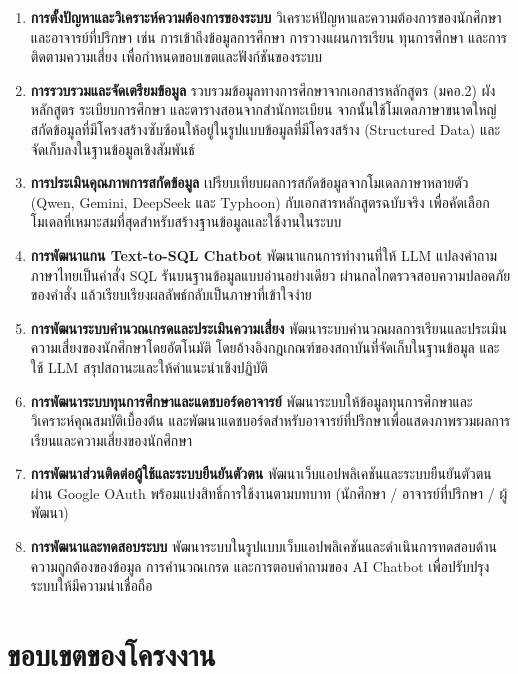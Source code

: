 \begin{enumerate}
    \item \textbf{การตั้งปัญหาและวิเคราะห์ความต้องการของระบบ} วิเคราะห์ปัญหาและความต้องการของนักศึกษาและอาจารย์ที่ปรึกษา เช่น การเข้าถึงข้อมูลการศึกษา การวางแผนการเรียน ทุนการศึกษา และการติดตามความเสี่ยง เพื่อกำหนดขอบเขตและฟังก์ชันของระบบ
    \item \textbf{การรวบรวมและจัดเตรียมข้อมูล} รวบรวมข้อมูลทางการศึกษาจากเอกสารหลักสูตร (มคอ.2) ผังหลักสูตร ระเบียบการศึกษา และตารางสอนจากสำนักทะเบียน จากนั้นใช้โมเดลภาษาขนาดใหญ่สกัดข้อมูลที่มีโครงสร้างซับซ้อนให้อยู่ในรูปแบบข้อมูลที่มีโครงสร้าง (Structured Data) และจัดเก็บลงในฐานข้อมูลเชิงสัมพันธ์
    \item \textbf{การประเมินคุณภาพการสกัดข้อมูล} เปรียบเทียบผลการสกัดข้อมูลจากโมเดลภาษาหลายตัว (Qwen, Gemini, DeepSeek และ Typhoon) กับเอกสารหลักสูตรฉบับจริง เพื่อคัดเลือกโมเดลที่เหมาะสมที่สุดสำหรับสร้างฐานข้อมูลและใช้งานในระบบ
    \item \textbf{การพัฒนาแกน Text-to-SQL Chatbot} พัฒนาแกนการทำงานที่ให้ LLM แปลงคำถามภาษาไทยเป็นคำสั่ง SQL รันบนฐานข้อมูลแบบอ่านอย่างเดียว ผ่านกลไกตรวจสอบความปลอดภัยของคำสั่ง แล้วเรียบเรียงผลลัพธ์กลับเป็นภาษาที่เข้าใจง่าย
    \item \textbf{การพัฒนาระบบคำนวณเกรดและประเมินความเสี่ยง} พัฒนาระบบคำนวณผลการเรียนและประเมินความเสี่ยงของนักศึกษาโดยอัตโนมัติ โดยอ้างอิงกฎเกณฑ์ของสถาบันที่จัดเก็บในฐานข้อมูล และใช้ LLM สรุปสถานะและให้คำแนะนำเชิงปฏิบัติ
    \item \textbf{การพัฒนาระบบทุนการศึกษาและแดชบอร์ดอาจารย์} พัฒนาระบบให้ข้อมูลทุนการศึกษาและวิเคราะห์คุณสมบัติเบื้องต้น และพัฒนาแดชบอร์ดสำหรับอาจารย์ที่ปรึกษาเพื่อแสดงภาพรวมผลการเรียนและความเสี่ยงของนักศึกษา
    \item \textbf{การพัฒนาส่วนติดต่อผู้ใช้และระบบยืนยันตัวตน} พัฒนาเว็บแอปพลิเคชันและระบบยืนยันตัวตนผ่าน Google OAuth พร้อมแบ่งสิทธิ์การใช้งานตามบทบาท (นักศึกษา / อาจารย์ที่ปรึกษา / ผู้พัฒนา)
    \item \textbf{การพัฒนาและทดสอบระบบ} พัฒนาระบบในรูปแบบเว็บแอปพลิเคชันและดำเนินการทดสอบด้านความถูกต้องของข้อมูล การคำนวณเกรด และการตอบคำถามของ AI Chatbot เพื่อปรับปรุงระบบให้มีความน่าเชื่อถือ
\end{enumerate}

\section{ขอบเขตของโครงงาน}

